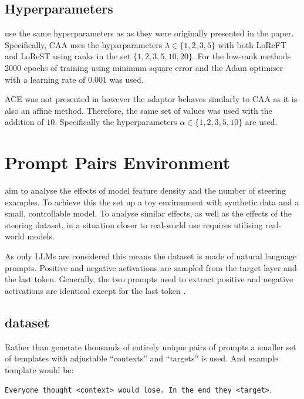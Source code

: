 \subsection{Hyperparameters}

 use the same hyperparameters as \citet{steering-clear} as they were originally presented in the paper.
Specifically, CAA uses the hyparparameters $\lambda \in \{1, 2, 3, 5\}$ with both LoReFT and LoReST using ranks in the set $\{1, 2, 3, 5, 10, 20\}$.
For the low-rank methods 2000 epochs of training using minimum square error and the Adam \cite{adam} optimiser with a learning rate of $0.001$ was used.

ACE was not presented in \citet{steering-clear} however the adaptor behaves similarly to CAA as it is also an affine method.
Therefore, the same set of values was used with the addition of $10$.
Specifically the hyperparameters $\alpha \in \{1, 2, 3, 5, 10\}$ are used.

\section{Prompt Pairs Environment}
\label{sec:prompt-pairs}

\citet{steering-clear} aim to analyse the effects of model feature density and the number of steering examples.
To achieve this the set up a toy environment with synthetic data and a small, controllable model.
To analyse similar effects, as well as the effects of the steering dataset, in a situation closer to real-world use requires utilising real-world models.

As only LLMs are considered this means the dataset is made of natural language prompts.
Positive and negative activations are sampled from the target layer and the last token.
Generally, the two prompts used to extract positive and negative activations are identical except for the last token \citep{steerability, icv, activation-addition}.

\subsection{dataset}
\label{sec:pp-dataset}

Rather than generate thousands of entirely unique pairs of prompts a smaller set of templates with adjustable ``contexts'' and ``targets'' is used.
And example template would be:

\texttt{Everyone thought <context> would lose. In the end they <target>}.

